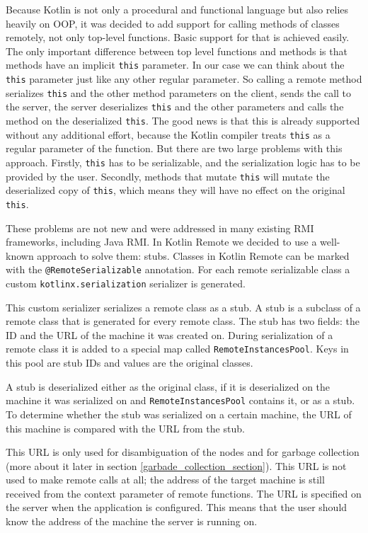 \documentclass[a4paper,11pt,oneside]{article}
\newcommand{\kotlini}[1]{\texttt{#1}}
\newcommand{\ki}[1]{\kotlini{#1}}
\begin{document}
Because Kotlin is not only a procedural and functional language but also relies heavily on OOP, it
was decided to add support for calling methods of classes remotely, not only top-level functions.
Basic support for that is achieved easily. The only important difference between top level
functions and methods is that methods have an implicit \ki{this} parameter. In our case we can
think about the \ki{this} parameter just like any other regular parameter. So calling a remote
method serializes \ki{this} and the other method parameters on the client, sends the call to the server,
the server deserializes \ki{this} and the other parameters and calls the method on the deserialized \ki{this}.
The good news is that this is already supported without any additional effort, because the Kotlin compiler treats
\ki{this} as a regular parameter of the function. But there are two large problems with this
approach. Firstly, \ki{this} has to be serializable, and the serialization logic has to be provided by
the user. Secondly, methods that mutate \ki{this} will mutate the deserialized copy of \ki{this}, which
means they will have no effect on the original \ki{this}.

These problems are not new and were addressed in many existing RMI frameworks, including Java RMI.
In Kotlin Remote we decided to use a well-known approach to solve them: stubs. Classes in
Kotlin Remote can be marked with the \ki{@RemoteSerializable} annotation. For each remote serializable class
a custom \texttt{kotlinx.serialization} serializer is generated.

This custom serializer serializes a remote class as a stub. A stub is a subclass of a remote class that
is generated for every remote class. The stub has two fields: the ID and the URL of the machine it was created on.
During serialization of a remote class it is added to a special map called \ki{RemoteInstancesPool}.
Keys in this pool are stub IDs and values are the original classes.

A stub is deserialized either as the original class, if it is deserialized on the machine it was
serialized on and \ki{RemoteInstancesPool} contains it, or as a stub. To determine whether the stub
was serialized on a certain machine, the URL of this machine is compared with the URL from the stub.

This URL is only used for disambiguation of the nodes and for garbage collection
(more about it later in section \ref{garbade_collection_section}). This URL is not used to make remote calls at all;
the address of the target machine is still received from the context parameter of remote functions. The URL is specified
on the server when the application is configured. This means that the user should know the address of the machine
the server is running on.
\end{document}
